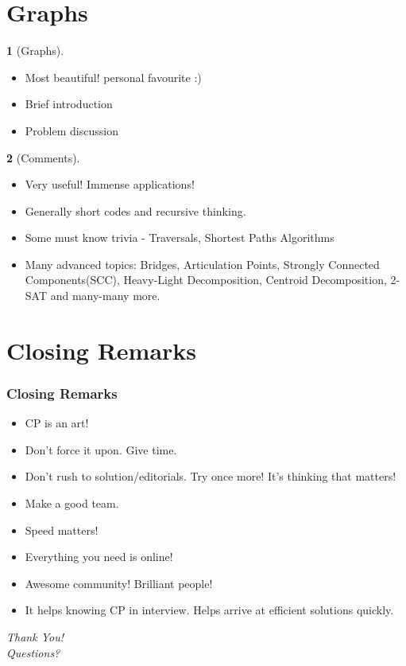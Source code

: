 \documentclass[mathserif,notheorems]{beamer} %
\theoremstyle{plain} %
\theoremstyle{definition} %
\newtheorem*{definition}{}%
\begin{document}
\section{Graphs}
\begin{frame}
\begin{definition}[Graphs]
	\begin{itemize}
		\item Most beautiful! personal favourite :)
		\item Brief introduction
		\item Problem discussion
	\end{itemize}
\end{definition}
\begin{definition}[Comments]
	\begin{itemize}
		\item Very useful! Immense applications!
		\item Generally short codes and recursive thinking.
		\item Some must know trivia - Traversals, Shortest Paths Algorithms
		\item Many advanced topics: Bridges, Articulation Points, Strongly Connected Components(SCC), Heavy-Light Decomposition, Centroid Decomposition, 2-SAT and many-many more.
	\end{itemize}
\end{definition}
\end{frame}

\section{Closing Remarks}
\begin{frame}
\frametitle{Closing Remarks}
	\begin{itemize}
		\item CP is an art!
		\item Don't force it upon. Give time.
		\item Don't rush to solution/editorials. Try once more! It's thinking that matters!
		\item Make a good team.
		\item Speed matters!
		\item Everything you need is online! 
		\item Awesome community! Brilliant people!
		\item It helps knowing CP in interview. Helps arrive at efficient solutions quickly.
	\end{itemize}
\end{frame}

\begin{frame}{}
  \centering \Large
  \emph{Thank You!\\}
  \emph{Questions?}
\end{frame}
\end{document}

